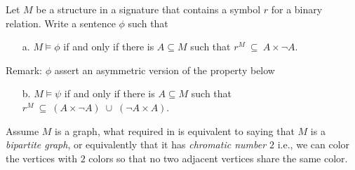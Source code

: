 \begin{exercise}\label{ex_grafo_bipartito}
Let $M$ be a structure in a signature that contains a symbol $r$ for a binary relation.
Write a sentence $\phi$ such that 
\begin{itemize} 
\item[a.] $M\models\phi$ if and only if there is $A\subseteq M$ such that $r^M\ \subseteq\ A\times\neg A$.
\end{itemize}
Remark: $\phi$ assert an asymmetric version of the property below
\begin{itemize} 
\item[b.] $M\models\psi$ if and only if there is $A\subseteq M$ such that $r^M\ \subseteq\ (A\times \neg A)\;\cup\;(\neg A\times A)$.
\end{itemize}
Assume $M$ is a graph, what required in  is equivalent to saying that $M$ is a \textit{bipartite graph}, or equivalently that it has \textit{chromatic number $2$\/} i.e., we can color the vertices with $2$ colors so that no two adjacent vertices share the same color.
\end{exercise}


